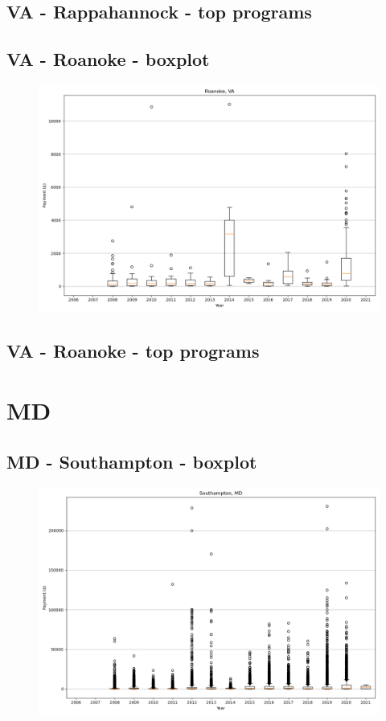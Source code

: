 \subsection*{VA - Rappahannock - top programs}

\newpage
\subsection*{VA - Roanoke - boxplot}
\begin{figure}[h]
\centering
\includegraphics[width=7in]{../output/boxplots/counties/Roanoke-VA_boxplot.png}
\end{figure}


\subsection*{VA - Roanoke - top programs}

\newpage
\section*{MD}
\subsection*{MD - Southampton - boxplot}
\begin{figure}[h]
\centering
\includegraphics[width=7in]{../output/boxplots/counties/Southampton-MD_boxplot.png}
\end{figure}


